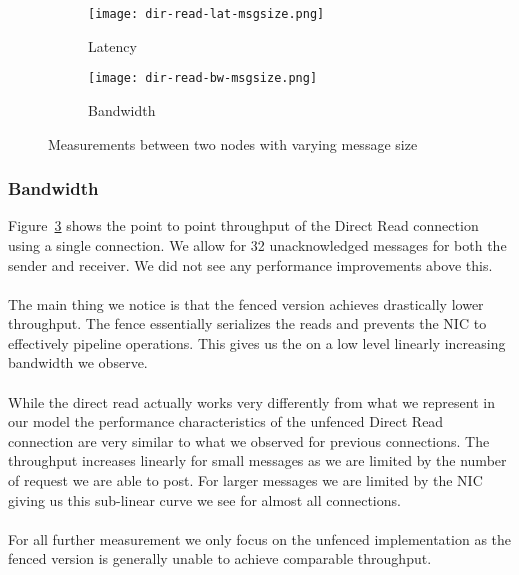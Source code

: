 \begin{figure}[htp]
  \centering
\begin{subfigure}[b]{0.49\textwidth}
  \texttt{[image: dir-read-lat-msgsize.png]}
  \caption{Latency}
  \label{fig:plot-dirread-lat}
\end{subfigure}
\begin{subfigure}[b]{0.49\textwidth}
  \centering
\texttt{[image: dir-read-bw-msgsize.png]}
  \caption{Bandwidth}
  \label{fig:plot-dirread-bw}
\end{subfigure}
\caption{Measurements between two nodes with varying message size}
\end{figure}


\subsubsection{Bandwidth}

Figure~\ref{fig:plot-dirread-bw} shows the point to point throughput of the Direct Read connection using a single connection.
We allow for 32 unacknowledged messages for both the sender and receiver. We did not see any performance improvements above
this.

\paragraph{} The main thing we notice is that the fenced version achieves drastically lower throughput. The fence essentially 
serializes the reads and prevents the NIC to effectively pipeline operations. This gives us the on a low level linearly 
increasing bandwidth we observe.

\paragraph{} While the direct read actually works very differently from what we represent in our model the performance 
characteristics of the unfenced Direct Read connection are very similar to what we observed for previous connections. The
throughput increases linearly for small messages as we are limited by the number of request we are able to post. For larger
messages we are limited by the NIC giving us this sub-linear curve we see for almost all connections.

\paragraph{} For all further measurement we only focus on the unfenced implementation as the fenced version is generally unable
to achieve comparable throughput.

